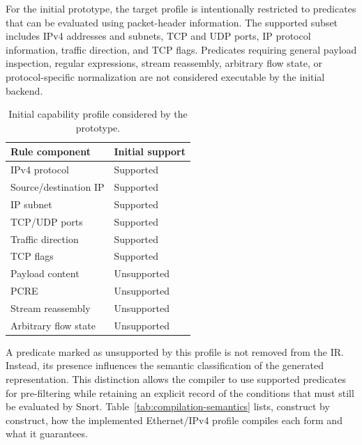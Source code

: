 \documentclass{article}
\begin{document}
For the initial prototype, the target profile is intentionally restricted
to predicates that can be evaluated using packet-header information. The
supported subset includes IPv4 addresses and subnets, TCP and UDP ports,
IP protocol information, traffic direction, and TCP flags. Predicates
requiring general payload inspection, regular expressions, stream
reassembly, arbitrary flow state, or protocol-specific normalization are
not considered executable by the initial backend.
\begin{table}[h]
\centering
\caption{Initial capability profile considered by the prototype.}
\label{tab:capabilities}
\begin{tabular}{ll}
\hline
\textbf{Rule component} & \textbf{Initial support} \\
\hline
IPv4 protocol           & Supported \\
Source/destination IP   & Supported \\
IP subnet               & Supported \\
TCP/UDP ports           & Supported \\
Traffic direction       & Supported \\
TCP flags               & Supported \\
Payload content         & Unsupported \\
PCRE                     & Unsupported \\
Stream reassembly       & Unsupported \\
Arbitrary flow state    & Unsupported \\
\hline
\end{tabular}
\end{table}
A predicate marked as unsupported by this profile is not removed from
the IR. Instead, its presence influences the semantic classification of
the generated representation. This distinction allows the compiler to
use supported predicates for pre-filtering while retaining an explicit
record of the conditions that must still be evaluated by Snort.
Table~\ref{tab:compilation-semantics} lists, construct by construct, how the
implemented Ethernet/IPv4 profile compiles each form and what it
guarantees.
\end{document}
